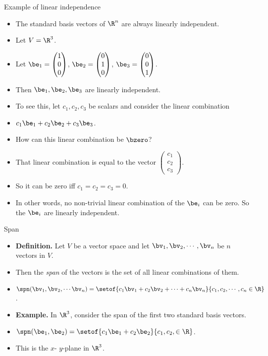 \documentclass{beamer}
\begin{document}
\begin{frame}{Example of linear independence}

\begin{itemize}
\item The standard basis vectors of $\R^n$ are always linearly independent.
\item Let $V = \R^3$.
\item Let $\be_1 =
\begin{pmatrix}
1 \\ 0 \\ 0
\end{pmatrix}
$,
$\be_2 =
\begin{pmatrix}
0 \\ 1 \\ 0
\end{pmatrix}
$,
$\be_3=
\begin{pmatrix}
0 \\ 0 \\ 1
\end{pmatrix}
$.

\item Then $\be_1,\be_2,\be_3$ are linearly independent.
\item To see this, let $c_1,c_2,c_3$ be scalars and consider the linear combination
\item $c_1\be_1+c_2\be_2+c_3\be_3$.
\item How can this linear combination be $\bzero$?
\item That linear combination is equal to the vector
$
\begin{pmatrix}
c_1 \\ c_2 \\ c_3
\end{pmatrix}
$.
\item So it can be zero iff $c_1=c_2=c_3=0$.
\item In other words, no non-trivial linear combination of the $\be_i$ can be zero.
So the $\be_i$ are linearly independent.
\end{itemize}

\end{frame}

\begin{frame}{Span}

\begin{itemize}
\item \textbf{Definition.} Let $V$ be a vector space and let $\bv_1,\bv_2,\cdots,\bv_n$ be $n$ vectors in $V$.
\item Then the \emph{span} of the vectors is the set of all linear combinations of them.
\item $\spn(\bv_1,\bv_2,\cdots\bv_n)=\setof{c_1\bv_1+c_2\bv_2+\cdots+c_n\bv_n}{c_1,c_2,\cdots,c_n\in\R}$.
\item \textbf{Example.} In $\R^3$, consider the span of the first two standard basis vectors.
\item $\spn(\be_1,\be_2) = \setof{c_1\be_1+c_2\be_2}{c_1,c_2,\in\R}$.
\item This is the $x$- $y$-plane in $\R^3$.
\end{itemize}

\end{frame}
\end{document}
